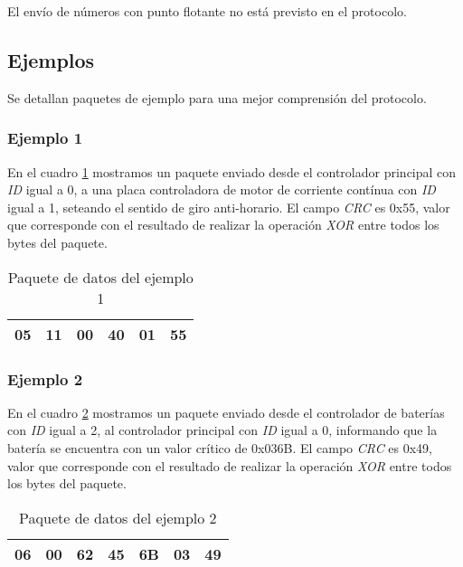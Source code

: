El env\'io de n\'umeros con punto flotante no est\'a previsto en el protocolo.

\subsection{Ejemplos}
\label{hA_protocolo_ejemplos}

Se detallan paquetes de ejemplo para una mejor comprensi\'on del protocolo.

\subsubsection{Ejemplo 1}
\label{hA_protocolo_ejemplo1}

En el cuadro \ref{hA_protocolo_paquete_ejemplo1} mostramos un paquete enviado desde el controlador principal con \emph{ID} igual a 0,
a una placa controladora de motor de corriente cont\'inua con \emph{ID} igual a 1, seteando el sentido de giro anti-horario.
El campo \emph{CRC} es 0x55, valor que corresponde con el resultado de realizar la operaci\'on \emph{XOR} entre
todos los bytes del paquete.

\begin{table}[h]
\begin{center}
\begin{tabular}{|c|c|c|c|c|c|}
\hline
05 & 11 & 00 & 40 & 01 & 55 \\
\hline
\end{tabular}
\caption{Paquete de datos del ejemplo 1}
\label{hA_protocolo_paquete_ejemplo1}
\end{center}
\end{table}

\subsubsection{Ejemplo 2}
\label{hA_protocolo_ejemplo2}

En el cuadro \ref{hA_protocolo_paquete_ejemplo2} mostramos un paquete enviado desde el controlador de bater\'ias con \emph{ID} igual a 2,
al controlador principal con \emph{ID} igual a 0, informando que la bater\'ia se encuentra con un valor cr\'itico de 0x036B.
El campo \emph{CRC} es 0x49, valor que corresponde con el resultado de realizar la operaci\'on \emph{XOR} entre
todos los bytes del paquete.

\begin{table}[h]
\begin{center}
\begin{tabular}{|c|c|c|c|c|c|c|}
\hline
06 & 00 & 62 & 45 & 6B & 03 & 49 \\
\hline
\end{tabular}
\caption{Paquete de datos del ejemplo 2}
\label{hA_protocolo_paquete_ejemplo2}
\end{center}
\end{table}

